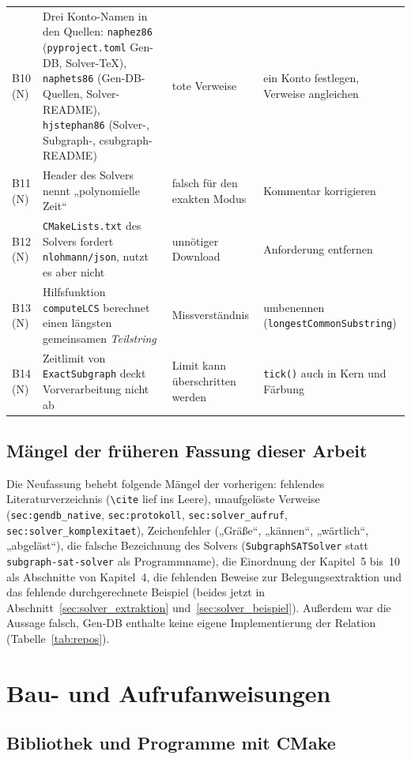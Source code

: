 {\begin{longtable}{@{}L{1.0cm}L{5.3cm}L{4.5cm}L{3.9cm}@{}}
	B10 (N) & Drei Konto-Namen in den Quellen: \texttt{naphez86} (\texttt{pyproject.toml} Gen-DB, Solver-TeX), \texttt{naphets86} (Gen-DB-Quellen, Solver-README), \texttt{hjstephan86} (Solver-, Subgraph-, csubgraph-README) & tote Verweise & ein Konto festlegen, Verweise angleichen \\[0.4em]
	B11 (N) & Header des Solvers nennt „polynomielle Zeit“ & falsch für den exakten Modus & Kommentar korrigieren \\[0.4em]
	B12 (N) & \texttt{CMakeLists.txt} des Solvers fordert \texttt{nlohmann/json}, nutzt es aber nicht & unnötiger Download & Anforderung entfernen \\[0.4em]
	B13 (N) & Hilfsfunktion \texttt{computeLCS} berechnet einen längsten gemeinsamen \emph{Teilstring} & Missverständnis & umbenennen (\texttt{longest\allowbreak Common\allowbreak Substring}) \\[0.4em]
	B14 (N) & Zeitlimit von \texttt{ExactSubgraph} deckt Vorverarbeitung nicht ab & Limit kann überschritten werden & \texttt{tick()} auch in Kern und Färbung \\
	\bottomrule
\end{longtable}
}

\section{Mängel der früheren Fassung dieser Arbeit}

Die Neufassung behebt folgende Mängel der vorherigen: fehlendes Literaturverzeichnis (\texttt{\textbackslash cite} lief ins Leere), unaufgelöste Verweise (\texttt{sec:gendb\_native}, \texttt{sec:protokoll}, \texttt{sec:solver\_aufruf}, \texttt{sec:solver\_komplexitaet}), Zeichenfehler („Gräße“, „kännen“, „wärtlich“, „abgeläst“), die falsche Bezeichnung des Solvers (\texttt{SubgraphSATSolver} statt \texttt{subgraph-sat-solver} als Programmname), die Einordnung der Kapitel~5 bis~10 als Abschnitte von Kapitel~4, die fehlenden Beweise zur Belegungsextraktion und das fehlende durchgerechnete Beispiel (beides jetzt in Abschnitt~\ref{sec:solver_extraktion} und~\ref{sec:solver_beispiel}). Außerdem war die Aussage falsch, Gen-DB enthalte keine eigene Implementierung der Relation (Tabelle~\ref{tab:repos}).

\chapter{Bau- und Aufrufanweisungen}
\label{chap:anleitung}

\section{Bibliothek und Programme mit CMake}

